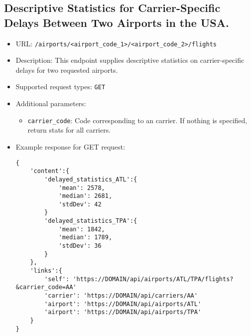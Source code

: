 \documentclass{article}
\begin{document}
    \subsection{Descriptive Statistics for Carrier-Specific Delays Between Two Airports in the USA.}
        \begin{itemize}
            \item URL: \texttt{/airports/<airport\_code\_1>/<airport\_code\_2>/flights}
            \item Description: This endpoint supplies descriptive statistics on carrier-specific delays for two requested airports.
            \item Supported request types: \texttt{GET}
             \item Additional parameters:
            \begin{itemize}
                \item \texttt{carrier\_code}: Code corresponding to an carrier. If nothing is specified, return stats for all carriers.
            \end{itemize}
            \item Example response for GET request:
            \begin{lstlisting}
{
    'content':{
        'delayed_statistics_ATL':{ 
            'mean': 2578,
            'median': 2681,
            'stdDev': 42
        }
        'delayed_statistics_TPA':{ 
            'mean': 1842,
            'median': 1789,
            'stdDev': 36
        }
    },
    'links':{
        'self': 'https://DOMAIN/api/airports/ATL/TPA/flights?&carrier_code=AA'
        'carrier': 'https://DOMAIN/api/carriers/AA'
        'airport': 'https://DOMAIN/api/airports/ATL'
        'airport': 'https://DOMAIN/api/airports/TPA'
    }
}
           \end{lstlisting}
        \end{itemize}
\end{document}
